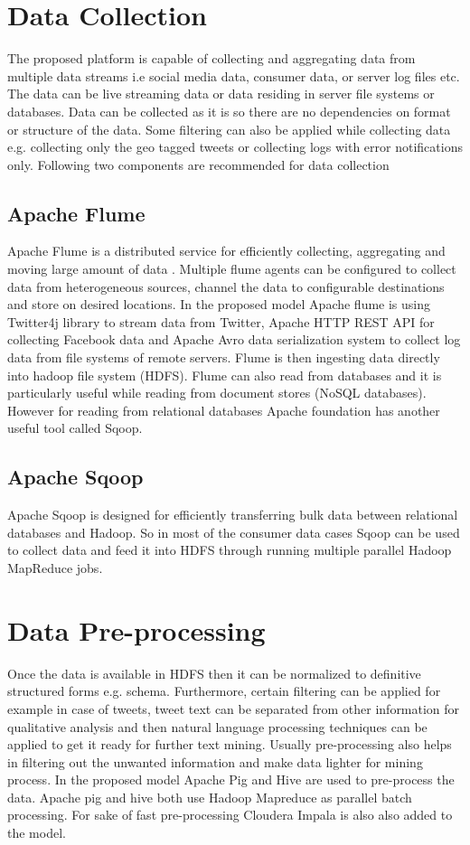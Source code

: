 \section{Data Collection}
The proposed platform is capable of collecting and aggregating data from multiple data streams i.e social media data, consumer data, or server log files etc. The data can be live streaming data or data residing in server file systems or databases. Data can be collected as it is so there are no dependencies on format or structure of the data. Some filtering can also be applied while collecting data e.g. collecting only the geo tagged tweets or collecting logs with error notifications only. Following two components are recommended for data collection
\subsection{Apache Flume}
Apache Flume is a distributed service for efficiently collecting, aggregating and moving large amount of data \cite{flume}. Multiple flume agents can be configured to collect data from heterogeneous sources, channel the data to configurable destinations and store on desired locations. In the proposed model Apache flume is using Twitter4j library to stream data from Twitter, Apache HTTP REST API for collecting Facebook data and Apache Avro\cite{avro} data serialization system to collect log data from file systems of remote servers. Flume is then ingesting data directly into hadoop file system (HDFS). Flume can also read from databases and it is particularly useful while reading from document stores (NoSQL databases). However for reading from relational databases Apache foundation has another useful tool called Sqoop.
\subsection{Apache Sqoop}
Apache Sqoop \cite{sqoop} is designed for efficiently transferring bulk data between relational databases and Hadoop. So in most of the consumer data cases Sqoop can be used to collect data and feed it into HDFS through running multiple parallel Hadoop MapReduce jobs.
\section{Data Pre-processing}
Once the data is available in HDFS then it can be normalized to definitive structured forms e.g. schema. Furthermore, certain filtering can be applied for example in case of tweets, tweet text can be separated from other information for qualitative analysis and then natural language processing techniques can be applied to get it ready for further text mining. Usually pre-processing also helps in filtering out the unwanted information and make data lighter for mining process. In the proposed model Apache Pig and Hive are used to pre-process the data. Apache pig and hive both use Hadoop Mapreduce as parallel batch processing. For sake of fast pre-processing Cloudera Impala is also also added to the model.
